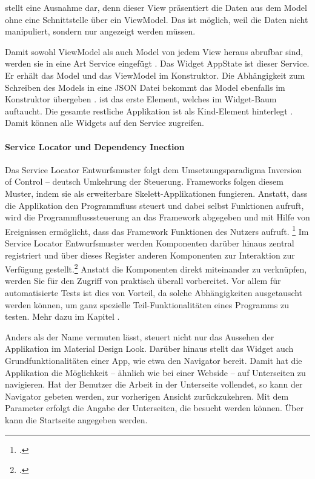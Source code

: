   stellt eine Ausnahme dar, denn dieser View präsentiert die Daten aus dem Model ohne eine Schnittstelle über ein ViewModel. Das ist möglich, weil die Daten nicht manipuliert, sondern nur angezeigt werden müssen.

Damit sowohl ViewModel als auch Model von jedem View heraus abrufbar sind, werden sie in eine Art Service eingefügt . Das Widget AppState ist dieser Service.  Er erhält das Model  und das ViewModel   im Konstruktor. Die Abhängigkeit zum Schreiben des Models in eine JSON Datei  bekommt das Model ebenfalls im Konstruktor übergeben .
 ist das erste Element, welches im Widget-Baum auftaucht. Die gesamte restliche Applikation ist als Kind-Element hinterlegt . Damit können alle Widgets auf den Service zugreifen.


\paragraph{Service Locator und Dependency Inection}

Das Service Locator Entwurfsmuster folgt dem Umsetzungsparadigma Inversion of Control – deutsch Umkehrung der Steuerung. Frameworks folgen diesem Muster, indem sie als erweiterbare Skelett-Applikationen fungieren. Anstatt, dass die Applikation den Programmfluss steuert und dabei selbst Funktionen aufruft, wird die Programmflusssteuerung an das Framework abgegeben und mit Hilfe von Ereignissen ermöglicht, dass das Framework Funktionen des Nutzers aufruft. \footcite[Vgl.][]{johnson1988designing}
Im Service Locator Entwurfsmuster werden Komponenten darüber hinaus zentral registriert und über dieses Register anderen Komponenten zur Interaktion zur Verfügung gestellt.\footcite[Vgl.][]{fowler2004DependencyInjection}
Anstatt die Komponenten direkt miteinander zu verknüpfen, werden Sie für den Zugriff von praktisch überall vorbereitet. Vor allem für automatisierte Tests ist dies von Vorteil, da solche Abhängigkeiten ausgetauscht werden können, um ganz spezielle Teil-Funktionalitäten eines Programms zu testen.  Mehr dazu im Kapitel .


Anders als der Name vermuten lässt, steuert  nicht nur das Aussehen der Applikation im Material Design Look. Darüber hinaus stellt das Widget auch Grundfunktionalitäten einer App, wie etwa den Navigator bereit. Damit hat die Applikation die Möglichkeit – ähnlich wie bei einer Webside – auf Unterseiten zu navigieren. Hat der Benutzer die Arbeit in der Unterseite vollendet, so kann der Navigator gebeten werden, zur vorherigen Ansicht zurückzukehren.  Mit dem Parameter   erfolgt die Angabe der Unterseiten, die besucht werden können.
Über   kann die Startseite angegeben werden.

